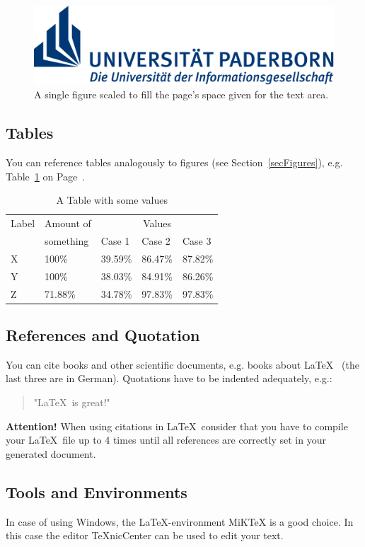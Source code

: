 \begin{figure}[t]
	\centering
	\includegraphics[width=\textwidth]{Images/TitlePage/uni-logo}
	\caption[Caption for the list of figures]{A single figure scaled to fill the page's space given for the text area.}
	\label{figUniKralleLarge}
\end{figure}


\subsection{Tables}

You can reference tables analogously to figures (see Section~\ref{secFigures}), e.g. Table~\ref{tabValues} on Page~\pageref{tabValues}.

\begin{table}[tb]
  \caption{A Table with some values}
  \label{tabValues}
  \centering
  \vspace{1ex}
		\begin{tabular}{l|l|l|l|l}
			Label & Amount of & \multicolumn{3}{c}{Values}\\
			& something & Case 1 & Case 2 & Case 3\\
			\hline
			\hline
			X & 100\% & 39.59\% & 86.47\% & 87.82\%\\
			\hline
			Y & 100\% & 38.03\% & 84.91\% & 86.26\%\\
			\hline
			Z & 71.88\% & 34.78\% & 97.83\% & 97.83\%\\
			\hline
		\end{tabular}
\end{table}


\subsection{References and Quotation}

You can cite books and other scientific documents, e.g. books about \LaTeX~ \cite{Latex4, Latex3, Latex1, Latex2} (the last three are in German).
Quotations have to be indented adequately, e.g.:

\begin{quotation}
	"\LaTeX~is great!"
\end{quotation}

\noindent\textbf{Attention!} When using citations in \LaTeX~consider that you have to compile your \LaTeX~file up to 4 times until all references are correctly set in your generated document.


\subsection{Tools and Environments}

In case of using Windows, the \LaTeX -environment MiKTeX \cite{MikTex} is a good choice. In this case the editor TeXnicCenter \cite{TexnicCenter} can be used to edit your text.